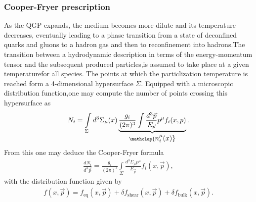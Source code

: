 \subsubsection*{Cooper-Fryer prescription}
As the {\sffamily QGP} expands, the medium becomes more dilute and its temperature decreases, eventually leading to a phase transition from a state of deconfined quarks and gluons to a hadron gas and then to reconfinement into hadrons.The transition between a hydrodynamic description in terms of the energy-momentum tensor and the subsequent produced particles,is assumed to take place at a given temperaturefor all species. The points at which the particlization temperature is reached form a 4-dimensional hypersurface $\Sigma$. Equipped with a microscopic distribution function,one may compute the number of points crossing this hypersurface as
\begin{align*}
    N_{i}=\int\limits_{\Sigma} d^{3} \Sigma_{\mu}(x)  \underbrace{\frac{g_i}{(2 \pi)^{3}}\int\frac{d^3\vec{p}}{E_{\vec{p}}} p^{\mu} f_{i}(x, p)}_{\mathclap{\textstyle n_i^\mu(x)}}.
\end{align*}
From this one may deduce the {\sffamily\color{ming} Cooper-Fryer} formula\cite{cooperfryer}
\begin{align*}
    \frac{d N_i}{d^{3} \vec{p}}=\frac{g_i}{(2 \pi)^{3}} \int\limits_{\Sigma}   \frac{d^{3}\Sigma_{\mu}p^{\mu}}{E_{\vec{p}}}f_i(x,\vec{p}) ,
\end{align*}
with the distribution function given by 
\begin{align*}
    f(x,\vec{p})=f_\text{eq}(x,\vec{p})+\delta f_\text{shear}(x,\vec{p})+\delta f_\text{bulk}(x,\vec{p}).
\end{align*}
